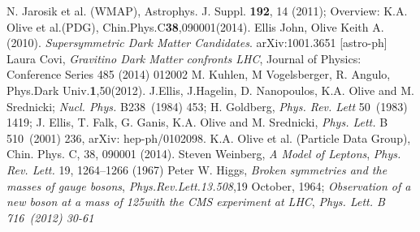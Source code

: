 \begin{thebibliography}{9}
 N. Jarosik et al. (WMAP), Astrophys. J. Suppl. \textbf{192}, 14 (2011); Overview: K.A. Olive et al.(PDG), Chin.Phys.C\textbf{38},090001(2014).
 Ellis John, Olive Keith A. (2010). \textit{Supersymmetric Dark Matter Candidates}. arXiv:1001.3651 [astro-ph]
 Laura Covi, \textit{Gravitino Dark Matter confronts LHC}, Journal of Physics: Conference Series 485 (2014) 012002
 M. Kuhlen, M Vogelsberger, R. Angulo, Phys.Dark Univ.\textbf{1},50(2012).
 J.Ellis, J.Hagelin, D. Nanopoulos, K.A. Olive and M. Srednicki; \emph{Nucl. Phys.} B238~(1984) 453; H. Goldberg, \emph{Phys. Rev. Lett} 50~(1983) 1419;
J. Ellis, T. Falk, G. Ganis, K.A. Olive and M. Srednicki, \emph{Phys. Lett.} B 510~(2001) 236, arXiv: hep-ph/0102098.
 K.A. Olive et al. (Particle Data Group), Chin. Phys. C, 38, 090001 (2014).
  Steven Weinberg, \textit{A Model of Leptons}, \emph{Phys. Rev. Lett.} 19, 1264–1266 (1967)
 Peter W. Higgs, \textit{Broken symmetries and the masses of gauge bosons}, \emph{Phys.Rev.Lett.13.508},19 October, 1964;
\textit{Observation of a new boson at a mass of 125\GeV with the CMS experiment at LHC}, \emph{Phys. Lett. B 716~(2012) 30-61}





\end{thebibliography}
